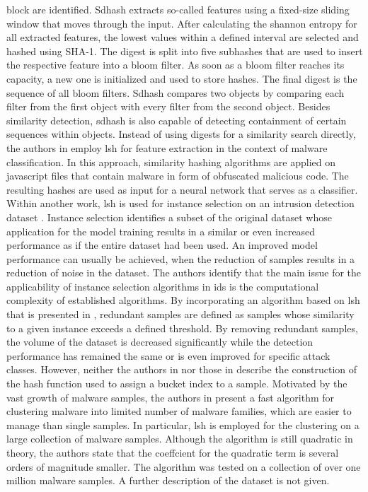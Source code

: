 \documentclass[../../main.tex]{subfiles}
\begin{document}
block are identified. Sdhash \cite{chow_data_2010} extracts so-called features using a fixed-size sliding window that moves through the input. After calculating the shannon entropy for all extracted features, the lowest values within a defined interval are selected and hashed using SHA-1. The digest is split into five subhashes that are used to insert the respective feature into a bloom filter. As soon as a bloom filter reaches its capacity, a new one is initialized and used to store hashes. The final digest is the sequence of all bloom filters. Sdhash compares two objects by comparing each filter from the first object with every filter from the second object. Besides similarity detection, sdhash is also capable of detecting containment of certain sequences within objects. Instead of using digests for a similarity search directly, the authors in \cite{ludwig_friborg_malware_2019} employ \gls{lsh} for feature extraction in the context of malware classification. In this approach, similarity hashing algorithms are applied on javascript files that contain malware in form of obfuscated malicious code. The resulting hashes are used as input for a neural network that serves as a classifier. Within another work, \gls{lsh} is used for instance selection on an intrusion detection dataset \cite{baldini2021intrusion}. Instance selection identifies a subset of the original dataset whose application for the model training results in a similar or even increased performance as if the entire dataset had been used. An improved model performance can usually be achieved, when the reduction of samples results in a reduction of noise in the dataset. The authors identify that the main issue for the applicability of instance selection algorithms in \gls{ids} is the computational complexity of established algorithms. By incorporating an algorithm based on \gls{lsh} that is presented in \cite{aslani2020fast}, redundant samples are defined as samples whose similarity to a given instance exceeds a defined threshold. By removing redundant samples, the volume of the dataset is decreased significantly while the detection performance has remained the same or is even improved for specific attack classes. However, neither the authors in \cite{baldini2021intrusion} nor those in \cite{aslani2020fast} describe the construction of the hash function used to assign a bucket index to a sample. Motivated by the vast growth of malware samples, the authors in \cite{opricsa2014locality} present a fast algorithm for clustering malware into limited number of malware families, which are easier to manage than single samples. In particular, \gls{lsh} is employed for the clustering on a large collection of malware samples. Although the algorithm is still quadratic in theory, the authors state that the coeffcient for the quadratic term is several orders of magnitude smaller. The algorithm was tested on a collection of over one million malware samples. A further description of the dataset is not given. 
\end{document}
